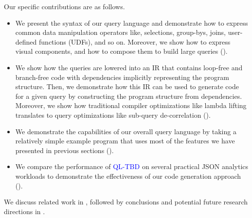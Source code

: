 \documentclass[runningheads]{llncs}
\newcommand{\lang}{\textcolor{blue}{QL-TBD}}
\begin{document}







Our specific contributions are as follows.

\begin{itemize}
    \item We present the syntax of our query language and demonstrate how to express common
          data manipulation operators like, selections, group-bys, joins, user-defined functions (UDFs),
          and so on.
          Moreover, we show how to express visual components, and how to compose them to build
          large queries ().
    \item We show how the queries are lowered into an IR that contains loop-free and branch-free code
          with dependencies implicitly representing the program structure.
          Then, we demonstrate how this IR can be used to generate code for a given query by constructing
          the program structure from dependencies.
          Moreover, we show how traditional compiler optimizations like lambda lifting translates to query
          optimizations like sub-query de-correlation ().
    \item We demonstrate the capabilities of our overall query language by taking a relatively simple example
          program that uses most of the features we have presented in previous sections ().
    \item We compare the performance of \lang{} on several practical JSON analytics workloads to demonstrate the
          effectiveness of our code generation approach ().
\end{itemize}

We discuss related work in , followed by conclusions and potential future research directions
in .
\end{document}
